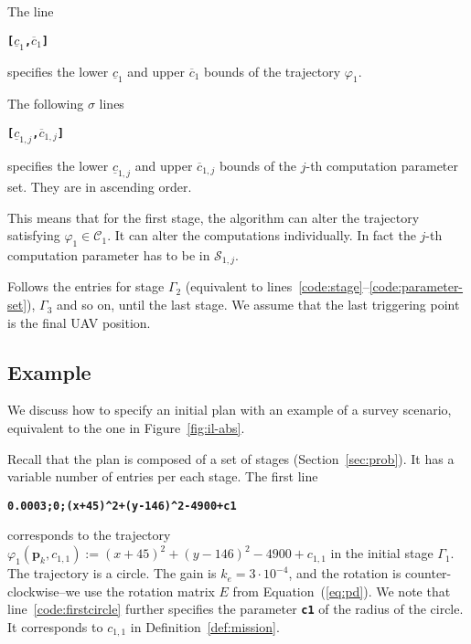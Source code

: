 \documentclass[letterpaper,10pt,conference]{ieeeconf}
\theoremstyle{definition}
\begin{document}
The line
\begin{algorithmic}[1]
  \State\textbf{\texttt{[$\underline{c}_1$,$\overline{c}_1$]}}\label{code:tee-set}
\end{algorithmic}
specifies the lower $\underline{c}_{1}$ and upper $\overline{c}_{1}$ bounds of the trajectory $\varphi_1$.

The following $\sigma$ lines
\begin{algorithmic}[1]
  \State\textbf{\texttt{[$\underline{c}_{1,j}$,$\overline{c}_{1,j}$]}}\label{code:parameter-set}
\end{algorithmic}
specifies the lower $\underline{c}_{1,j}$ and upper $\overline{c}_{1,j}$ bounds of the $j$-th computation parameter set. They are in ascending order. 

This means that for the first stage, the algorithm can alter the trajectory satisfying $\varphi_1\in\mathcal{C}_1$. It can alter the computations individually. In fact the $j$-th computation parameter has to be in $\mathcal{S}_{1,j}$.

Follows the entries for stage $\Gamma_2$ (equivalent to lines~\ref{code:stage}--\ref{code:parameter-set}), $\Gamma_3$ and so on, until the last stage. We assume that the last triggering point is the final UAV position.

\subsection{Example}
\label{app:plan-example}

We discuss how to specify an initial plan with an example of a survey scenario, equivalent to the one in Figure~\ref{fig:il-abs}.  

Recall that the plan is composed of a set of stages (Section~\ref{sec:prob}). It has a variable number of entries per each stage. The first line
\begin{algorithmic}[1]
  \State\textbf{\texttt{0.0003;0;(x+45)\^{}2+(y-146)\^{}2-4900+c1}}\label{code:firstcircle}
\end{algorithmic}
corresponds to the trajectory $\varphi_1(\mathbf{p}_k,c_{1,1}):=(x+45)^2+(y-146)^2-4900+c_{1,1}$ in the initial stage $\Gamma_1$. The trajectory is a circle. The gain is $k_e=3\cdot 10^{-4}$, and the rotation is counter-clockwise--we use the rotation matrix $E$ from Equation~(\ref{eq:pd}). We note that line~\ref{code:firstcircle} further specifies the parameter {\tt\textbf{c1}} of the radius of the circle. It corresponds to $c_{1,1}$ in Definition~\ref{def:mission}.
\end{document}
